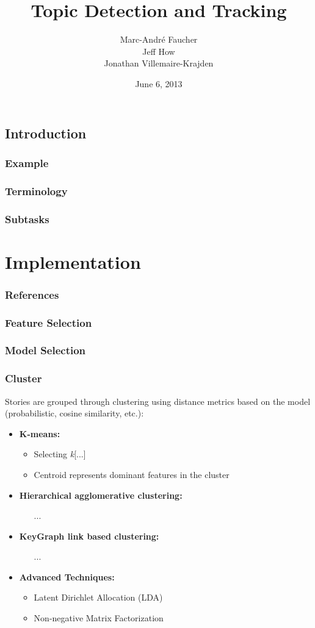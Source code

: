 \documentclass{beamer}
\title{Topic Detection and Tracking}
\author{
Marc-André Faucher\\
Jeff How\\
Jonathan Villemaire-Krajden}
\date{June 6, 2013}
\begin{document}
\begin{frame}[plain]
\section{Introduction}
\frametitle{Example}
\titlepage
\end{frame}

\begin{frame}[plain]
\frametitle{Terminology}
\end{frame}

\begin{frame}
\frametitle{Subtasks}
\end{frame}

\section{Implementation}
\begin{frame}
\frametitle{References}
\end{frame}

\begin{frame}
\frametitle{Feature Selection}
\end{frame}

\begin{frame}
\frametitle{Model Selection}
\end{frame}

\begin{frame}
\frametitle{Cluster}
Stories are grouped through clustering using distance metrics based on the
model (probabilistic, cosine similarity, etc.):
\begin{itemize}
	\item {\bf K-means:}
		\begin{itemize}
			\item Selecting \emph{k}[...] 
			\item Centroid represents dominant features in the cluster
		\end{itemize}
	\item {\bf Hierarchical agglomerative clustering:}
		\begin{itemize}
			\item[...]
		\end{itemize}
	\item {\bf KeyGraph link based clustering:}
		\begin{itemize}
			\item[...]
		\end{itemize}
	\item {\bf Advanced Techniques:}
		\begin{itemize}
			\item Latent Dirichlet Allocation (LDA)
			\item Non-negative Matrix Factorization
		\end{itemize}
\end{itemize}
\end{frame}
\end{document}
